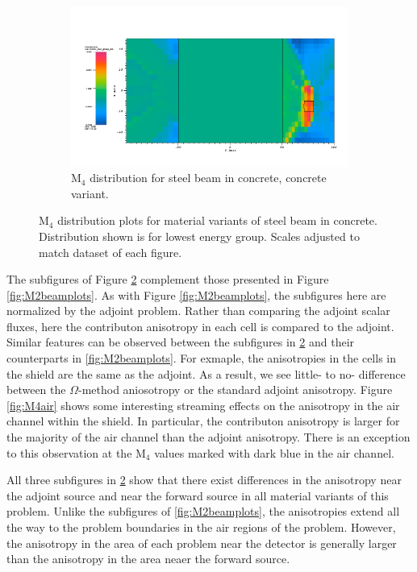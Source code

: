 \begin{figure}[htb!]\ContinuedFloat
  \centering
  \begin{subfigure}[t]{\textwidth}
    \includegraphics[width=0.9\linewidth]{./chapters/characterization_probs/figures/char/prob1v2/prob1v2M4G26.png}
    \caption{M$_4$ distribution for steel beam in concrete, concrete variant.}
    \label{fig:M4concrete}
  \end{subfigure}
  \caption[M$_4$ distribution plots for material variants of steel beam in
  concrete.]{M$_4$ distribution plots for material variants of steel beam in
  concrete. Distribution shown is for lowest energy group. Scales adjusted to
  match dataset of each figure.}
  \label{fig:M4beamplots}
\end{figure}

The subfigures of Figure \ref{fig:M4beamplots} complement those presented in
Figure \ref{fig:M2beamplots}. As with Figure \ref{fig:M2beamplots}, the
subfigures here are normalized by the adjoint problem. Rather than comparing the
adjoint scalar fluxes, here the contributon anisotropy in each
cell is compared to the adjoint. Similar features can be observed between the
subfigures in \ref{fig:M4beamplots} and their counterparts in
\ref{fig:M2beamplots}. For exmaple, the anisotropies in the cells in the shield
are the same as the adjoint. As a result, we see little- to no- difference
between the $\Omega$-method aniosotropy or the standard adjoint anisotropy.
Figure \ref{fig:M4air} shows some interesting streaming effects on the
anisotropy in the air channel within the shield. In particular, the contributon
anisotropy is larger for the majority of the air channel than the adjoint
anisotropy. There is an exception to this observation at the M$_4$ values marked
with dark blue in the air channel.

All three subfigures in \ref{fig:M4beamplots} show that there exist differences
in the anisotropy near the adjoint source and near the forward source in all
material variants of this problem. Unlike the subfigures of
\ref{fig:M2beamplots}, the anisotropies extend all the way to the problem
boundaries in the air regions of the problem. However,
the anisotropy in the area of each
problem near the detector is generally larger than the anisotropy in the area
neaer the forward source.

